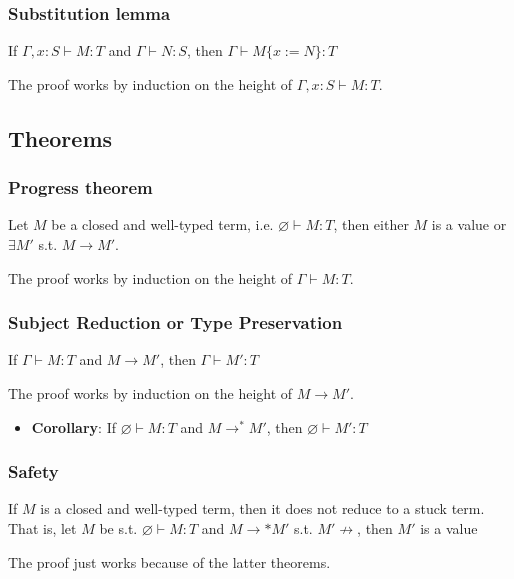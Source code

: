 \documentclass[11pt]{article}
\newcommand{\subs}[2]{\ensuremath{\{ #1 := #2 \}}}
\newcommand{\type}[2]{\ensuremath{ #1 : #2 }}
\let\emptyset\varnothing
\begin{document}
\subsubsection*{Substitution lemma}
\label{sec:orgdf4cee5}
If \(\Gamma,\type{x}{S}\vdash\type{M}{T}\) and
\(\Gamma\vdash\type{N}{S}\), then \(\Gamma \vdash \type{M
    \subs{x}{N}}{T}\)

The proof works by induction on the height of \(\Gamma,
    \type{x}{S}\vdash \type{M}{T}\).

\subsection*{Theorems}
\label{sec:org928ed05}

\subsubsection*{Progress theorem}
\label{sec:orgb234843}
Let \(M\) be a closed and well-typed term, i.e. \(\emptyset
    \vdash\type{M}{T}\), then either \(M\) is a value or \(\exists M'\)
s.t. \(M\to M'\).

The proof works by induction on the height of \(\Gamma\vdash
    \type{M}{T}\).

\subsubsection*{Subject Reduction or Type Preservation}
\label{sec:org82b4c71}
If \(\Gamma\vdash\type{M}{T}\) and \(M\to M'\), then \(\Gamma
    \vdash \type{M'}{T}\)

The proof works by induction on the height of \(M\to M'\).

\begin{itemize}
\item \textbf{Corollary}:
\label{sec:org335b7ab}
If \(\emptyset\vdash\type{M}{T}\) and \(M \to^* M'\), then
\(\emptyset\vdash\type{M'}{T}\)
\end{itemize}

\subsubsection*{Safety}
\label{sec:org7c73e2e}
If \(M\) is a closed and well-typed term, then it does not reduce
to a stuck term. That is, let \(M\) be s.t. \(\emptyset \vdash
    \type{M}{T}\) and \(M\to* M'\) s.t. \(M'\not\to\), then \(M'\) is
a value

The proof just works because of the latter theorems.
\end{document}
